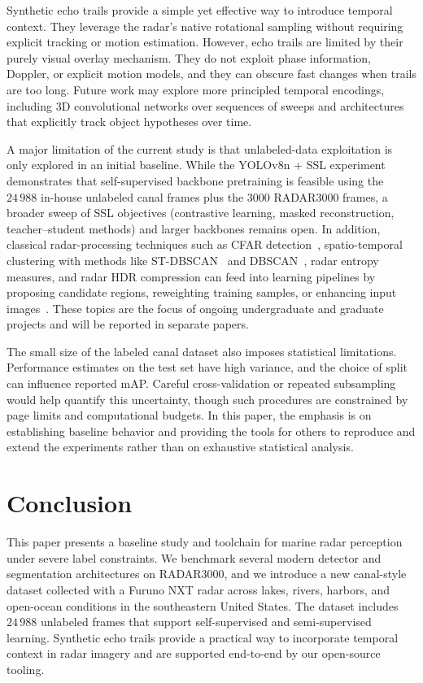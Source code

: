 \documentclass[conference]{IEEEtran}
\begin{document}
Synthetic echo trails provide a simple yet effective way to introduce temporal context. They leverage the radar's native rotational sampling without requiring explicit tracking or motion estimation. However, echo trails are limited by their purely visual overlay mechanism. They do not exploit phase information, Doppler, or explicit motion models, and they can obscure fast changes when trails are too long. Future work may explore more principled temporal encodings, including 3D convolutional networks over sequences of sweeps and architectures that explicitly track object hypotheses over time.

A major limitation of the current study is that unlabeled-data exploitation is only explored in an initial baseline. While the YOLOv8n + SSL experiment demonstrates that self-supervised backbone pretraining is feasible using the $24\,988$ in-house unlabeled canal frames plus the $3000$ RADAR3000 frames, a broader sweep of SSL objectives (contrastive learning, masked reconstruction, teacher--student methods) and larger backbones remains open. In addition, classical radar-processing techniques such as CFAR detection~\cite{rashid2025cfar_sar_vessels}, spatio-temporal clustering with methods like ST-DBSCAN~\cite{birant2007st_dbscan} and DBSCAN~\cite{ester1996dbscan}, radar entropy measures, and radar HDR compression can feed into learning pipelines by proposing candidate regions, reweighting training samples, or enhancing input images~\cite{richards2014fundamentals_radar_signal_processing}. These topics are the focus of ongoing undergraduate and graduate projects and will be reported in separate papers.

The small size of the labeled canal dataset also imposes statistical limitations. Performance estimates on the test set have high variance, and the choice of split can influence reported mAP. Careful cross-validation or repeated subsampling would help quantify this uncertainty, though such procedures are constrained by page limits and computational budgets. In this paper, the emphasis is on establishing baseline behavior and providing the tools for others to reproduce and extend the experiments rather than on exhaustive statistical analysis.

\section{Conclusion}
\label{sec:conclusion}
This paper presents a baseline study and toolchain for marine radar perception under severe label constraints. We benchmark several modern detector and segmentation architectures on RADAR3000, and we introduce a new canal-style dataset collected with a Furuno NXT radar across lakes, rivers, harbors, and open-ocean conditions in the southeastern United States. The dataset includes $24\,988$ unlabeled frames that support self-supervised and semi-supervised learning. Synthetic echo trails provide a practical way to incorporate temporal context in radar imagery and are supported end-to-end by our open-source tooling.
\end{document}
